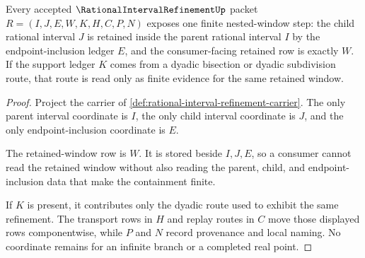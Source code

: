 \begin{theorem}
\label{thm:rational-interval-refinement-nested-window}
Every accepted $\RationalIntervalRefinementUp$ packet $R=(I,J,E,W,K,H,C,P,N)$ exposes one finite nested-window step: the child rational interval $J$ is retained inside the parent rational interval $I$ by the endpoint-inclusion ledger $E$, and the consumer-facing retained row is exactly $W$. If the support ledger $K$ comes from a dyadic bisection or dyadic subdivision route, that route is read only as finite evidence for the same retained window.
\end{theorem}
\begin{proof}
Project the carrier of \autoref{def:rational-interval-refinement-carrier}. The only parent interval coordinate is $I$, the only child interval coordinate is $J$, and the only endpoint-inclusion coordinate is $E$.

The retained-window row is $W$. It is stored beside $I,J,E$, so a consumer cannot read the retained window without also reading the parent, child, and endpoint-inclusion data that make the containment finite.

If $K$ is present, it contributes only the dyadic route used to exhibit the same refinement. The transport rows in $H$ and replay routes in $C$ move those displayed rows componentwise, while $P$ and $N$ record provenance and local naming. No coordinate remains for an infinite branch or a completed real point.
\end{proof}

